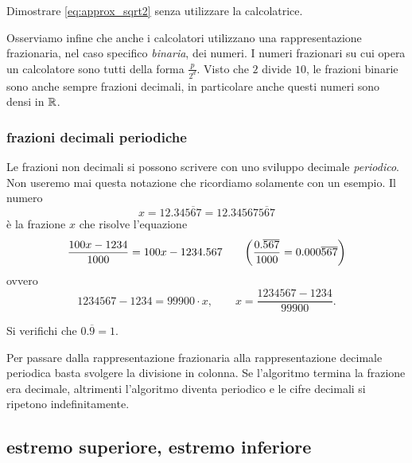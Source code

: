 \begin{exercise}
Dimostrare \ref{eq:approx_sqrt2} senza 
utilizzare la calcolatrice.
\end{exercise}

Osserviamo infine che anche i calcolatori utilizzano una rappresentazione frazionaria, 
nel caso specifico \emph{binaria}, dei numeri.
I numeri frazionari su cui opera un calcolatore sono tutti della forma $\frac{p}{2^d}$.
Visto che $2$ divide $10$, le frazioni binarie sono anche sempre frazioni decimali, 
in particolare anche questi numeri sono densi in ${\mathbb R}$.

\subsubsection{frazioni decimali periodiche}

Le frazioni non decimali si possono scrivere con uno sviluppo
decimale \emph{periodico}. 
Non useremo mai questa notazione
che ricordiamo solamente con un esempio.
Il numero
\[
  x = 12.34\overline{567}
    = 12.34567\overline{567}
\]
è la frazione $x$ che risolve l'equazione
\[
  \frac{100x - 1234}{1000}
  = 100x-1234.567
  \qquad
{\left( \frac{0.\overline{567}}{1000}
= 0.000\overline{567}  \right)}
\]
ovvero
\[
  1234567 - 1234 = 99900 \cdot x,
  \qquad x = \frac{1234567-1234}{99900}.
\]

\begin{exercise}
Si verifichi che $0.\overline 9 = 1$.
\end{exercise}
    
Per passare dalla rappresentazione frazionaria alla rappresentazione 
decimale periodica basta svolgere la divisione in colonna.
Se l'algoritmo termina la frazione era decimale, altrimenti l'algoritmo 
diventa periodico e le cifre decimali si ripetono indefinitamente.

\subsection{estremo superiore, estremo inferiore}

